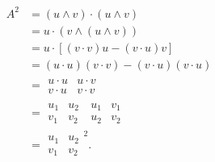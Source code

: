 \documentclass[12pt]{article}
\begin{document}
\begin{align*}
    A^2 &= (u \wedge v) \cdot (u \wedge v)\\
    &= u \cdot (v \wedge (u \wedge v))\\
    &= u \cdot [(v \cdot v)u - (v \cdot u)v]\\
    &= (u \cdot u)(v \cdot v) - (v \cdot u)(v \cdot u)\\
    &= \begin{array}{|cc|}
    u \cdot u & u \cdot v\\
    v \cdot u & v \cdot v
    \end{array}\\
    &= \begin{array}{|cc|}
    u_1 & u_2\\
    v_1 & v_2
    \end{array}~
    \begin{array}{|cc|}
    u_1 & v_1\\
    u_2 & v_2
    \end{array}\\
    &=\begin{array}{|cc|}
    u_1 & u_2\\
    v_1 & v_2
    \end{array}^2.
\end{align*}
\end{document}

